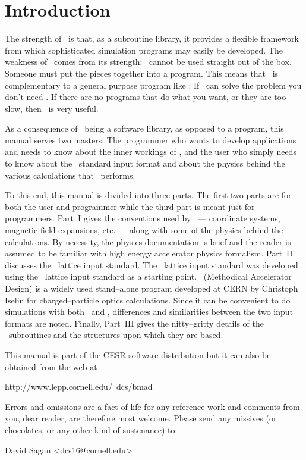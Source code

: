 \section*{Introduction}

The strength of \bmad\ is that, as a subroutine library, it provides a
flexible framework from which sophisticated simulation programs may
easily be developed.  The weakness of \bmad\ comes from its strength:
\bmad\ cannot be used straight out of the box. Someone must put the
pieces together into a program. This means that \bmad\ is complementary
to a general purpose program like \mad\cite{b:maduser,b:madphysics}: 
If \mad\ can solve the problem
you don't need \bmad. If there are no programs that do what you want,
or they are too slow, then \bmad\ is very useful.

As a consequence of \bmad\ being a software library, as opposed to a
program, this manual serves two masters: The programmer who wants to
develop applications and needs to know about the inner workings of \bmad,
and the user who simply needs to know about the \bmad\ standard input
format and about the physics behind the various calculations that \bmad\
performs.

To this end, this manual is divided into three parts. The first two
parts are for both the user and programmer while the third part is
meant just for programmers. Part~I gives the conventions used by
\bmad\ --- coordinate systems, magnetic field expansions, etc. ---
along with some of the physics behind the calculations. By necessity,
the physics documentation is brief and the reader is assumed to be familiar
with high energy accelerator physics formalism. Part~II discusses the
\bmad\ lattice input standard.  The \bmad\ lattice input standard was
developed using the \mad\ lattice input standard as a starting
point. \mad\ (Methodical Accelerator Design) is a widely used
stand--alone program developed at CERN by Christoph Iselin for
charged--particle optics calculations. Since it can be convenient
to do simulations with both \mad\ and \bmad, differences and
similarities between the two input formats are noted. 
Finally, Part~III gives the nitty--gritty details of the \bmad\
subroutines and the structures upon which they are based.

This manual is part of the 
CESR software distribution but it can also be obtained from the web at
\begin{example}
  http://www.lepp.cornell.edu/~dcs/bmad
\end{example}

Errors and omissions are a fact of life for any reference work and
comments from you, dear reader, are therefore most welcome. Please
send any missives (or chocolates, or any other kind of sustenance) to:
\begin{example}
  David Sagan <dcs16@cornell.edu>
\end{example}
